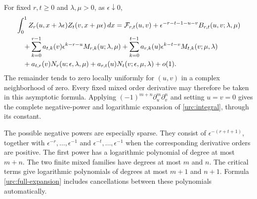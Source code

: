 \begin{theorem}
\label{urc:full-theorem}
For fixed $r,t\ge0$ and $\lambda,\mu>0$, as $\epsilon\downarrow0$,
\begin{align}
 &\int_0^1Z_r(u,x+\lambda\epsilon)Z_t(v,x+\mu\epsilon)\,dx
 =\mathcal F_{r,t}(u,v)
   +\epsilon^{-r-t-1-u-v}B_{r,t}(u,v;\lambda,\mu)\notag\\
 &\quad+\sum_{k=0}^{r-1}a_{t,k}(v)
               \epsilon^{k-r-u}M_{r,k}(u;\lambda,\mu)
       +\sum_{k=0}^{t-1}a_{r,k}(u)
               \epsilon^{k-t-v}M_{t,k}(v;\mu,\lambda)\notag\\
 &\quad+a_{t,r}(v)N_r(u;\epsilon,\lambda,\mu)
       +a_{r,t}(u)N_t(v;\epsilon,\mu,\lambda)+o(1).
 \label{urc:full-expansion}
\end{align}
The remainder tends to zero locally uniformly for $(u,v)$ in a
complex neighborhood of zero. Every fixed mixed order derivative
may therefore be taken in this asymptotic formula. Applying
$(-1)^{m+n}\partial_u^m\partial_v^n$ and setting $u=v=0$ gives
the complete negative-power and logarithmic expansion of
\eqref{urc:integral}, through its constant.
\end{theorem}

The possible negative powers are especially sparse. They consist of
$\epsilon^{-(r+t+1)}$, together with $\epsilon^{-r},\ldots,
\epsilon^{-1}$ and $\epsilon^{-t},\ldots,\epsilon^{-1}$ when the
corresponding derivative orders are positive. The first power has
a logarithmic polynomial of degree at most $m+n$. The two finite
mixed families have degrees at most $m$ and $n$. The critical
terms give logarithmic polynomials of degrees at most $m+1$ and
$n+1$. Formula \eqref{urc:full-expansion} includes cancellations
between these polynomials automatically.

